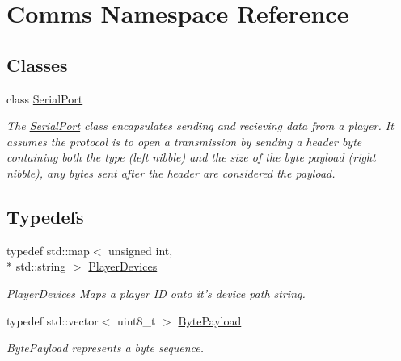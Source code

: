 \hypertarget{namespaceComms}{\section{Comms Namespace Reference}
\label{namespaceComms}
}
\subsection*{Classes}
\begin{DoxyCompactItemize}
\item 
class \hyperlink{classComms_1_1SerialPort}{Serial\-Port}
\begin{DoxyCompactList}\small\item\em The \hyperlink{classComms_1_1SerialPort}{Serial\-Port} class encapsulates sending and recieving data from a player. It assumes the protocol is to open a transmission by sending a header byte containing both the type (left nibble) and the size of the byte payload (right nibble), any bytes sent after the header are considered the payload. \end{DoxyCompactList}\end{DoxyCompactItemize}
\subsection*{Typedefs}
\begin{DoxyCompactItemize}
\item 
typedef std\-::map$<$ unsigned int, \\*
std\-::string $>$ \hyperlink{namespaceComms_ae7f8ecf87c32fe890069143ff75f2885}{Player\-Devices}
\begin{DoxyCompactList}\small\item\em Player\-Devices Maps a player I\-D onto it's device path string. \end{DoxyCompactList}\item 
typedef std\-::vector$<$ uint8\-\_\-t $>$ \hyperlink{namespaceComms_ada8b41d9f3f987d621ee196a4a760238}{Byte\-Payload}
\begin{DoxyCompactList}\small\item\em Byte\-Payload represents a byte sequence. \end{DoxyCompactList}\end{DoxyCompactItemize}
